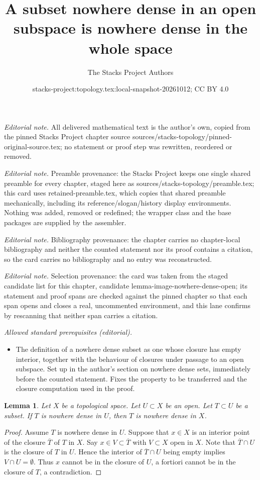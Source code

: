 \documentclass[10pt,a4paper]{amsart}
\title{A subset nowhere dense in an open subspace is nowhere dense in the whole space}
\author{The Stacks Project Authors}
\date{stacks-project:topology.tex:local-snapshot-20261012; CC BY 4.0}
\theoremstyle{plain}
\newtheorem{lemma}[subsection]{Lemma}
\theoremstyle{definition}
\theoremstyle{remark}
\numberwithin{equation}{subsection}
\begin{document}
\maketitle
\noindent\textit{Editorial note.} All delivered mathematical text is the author's own, copied from the pinned Stacks Project chapter source sources/stacks-topology/pinned-original-source.tex; no statement or proof step was rewritten, reordered or removed.\par\medskip
\noindent\textit{Editorial note.} Preamble provenance: the Stacks Project keeps one single shared preamble for every chapter, staged here as sources/stacks-topology/preamble.tex; this card uses retained-preamble.tex, which copies that shared preamble mechanically, including its reference/slogan/history display environments. Nothing was added, removed or redefined; the wrapper class and the base packages are supplied by the assembler.\par\medskip
\noindent\textit{Editorial note.} Bibliography provenance: the chapter carries no chapter-local bibliography and neither the counted statement nor its proof contains a citation, so the card carries no bibliography and no entry was reconstructed.\par\medskip
\noindent\textit{Editorial note.} Selection provenance: the card was taken from the staged candidate list for this chapter, candidate lemma-image-nowhere-dense-open; its statement and proof spans are checked against the pinned chapter so that each span opens and closes a real, uncommented environment, and this lane confirms by rescanning that neither span carries a citation.\par\medskip
\noindent\textit{Allowed standard prerequisites (editorial).}\begin{itemize}
\item The definition of a nowhere dense subset as one whose closure has empty interior, together with the behaviour of closures under passage to an open subspace. Set up in the author's section on nowhere dense sets, immediately before the counted statement. Fixes the property to be transferred and the closure computation used in the proof.
\end{itemize}\medskip
\begin{lemma}
\label{lemma-image-nowhere-dense-open}
Let $X$ be a topological space.
Let $U \subset X$ be an open.
Let $T \subset U$ be a subset.
If $T$ is nowhere dense in $U$, then $T$ is nowhere dense in $X$.
\end{lemma}

\begin{proof}
Assume $T$ is nowhere dense in $U$.
Suppose that $x \in X$ is an interior point of the closure
$\overline{T}$ of $T$ in $X$. Say $x \in V \subset \overline{T}$
with $V \subset X$ open in $X$. Note that $\overline{T} \cap U$ is
the closure of $T$ in $U$. Hence the interior of $\overline{T} \cap U$
being empty implies $V \cap U = \emptyset$. Thus $x$ cannot be in the
closure of $U$, a fortiori cannot be in the closure of $T$, a contradiction.
\end{proof}
\end{document}
